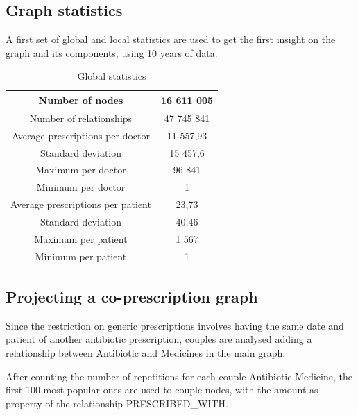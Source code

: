 \subsection{Graph statistics}
A first set of global and local statistics are used to get the first insight on the graph and its components, using 10 years of data.

\begin{table}[h]
	\centering
	\begin{tabular}{c|c}
		Number of nodes & 16 611 005 \\
		\hline
		Number of relationships & 47 745 841 \\
		\hline
		Average prescriptions per doctor & 11 557,93 \\
		\hline
		Standard deviation & 15 457,6 \\
		\hline
		Maximum per doctor & 96 841 \\
		\hline
		Minimum per doctor & 1 \\
		\hline
		Average prescriptions per patient & 23,73 \\
		\hline
		Standard deviation & 40,46 \\
		\hline
		Maximum per patient & 1 567 \\
		\hline
		Minimum per patient & 1
	\end{tabular}
\caption{\small Global statistics}
\end{table}

\subsection{Projecting a co-prescription graph}
Since the restriction on generic prescriptions involves having the same date and patient of another antibiotic prescription, couples are analysed adding a relationship between Antibiotic and Medicines in the main graph.

After counting the number of repetitions for each couple Antibiotic-Medicine, the first 100 most popular ones are used to couple nodes, with the amount as property of the relationship PRESCRIBED\_WITH.

